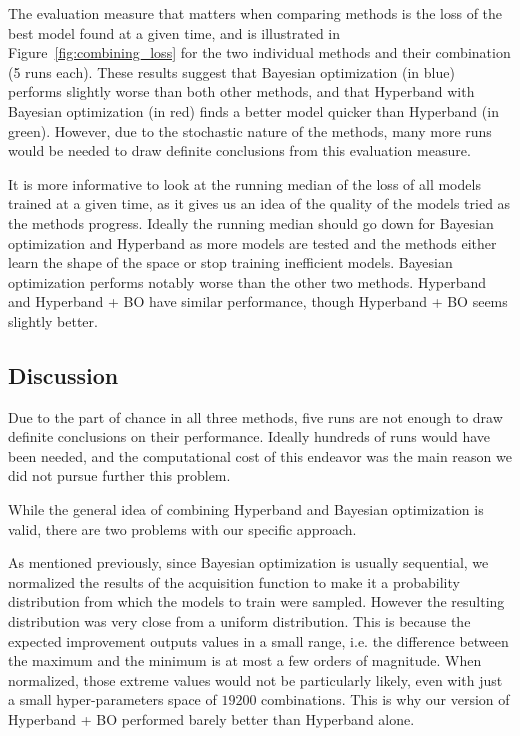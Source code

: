 The evaluation measure that matters when comparing methods is the loss of the best model found at a given time, and is illustrated in Figure~\ref{fig:combining_loss} for the two individual methods and their combination (5 runs each). 
These results suggest that Bayesian optimization (in blue) performs slightly worse than both other methods, and that Hyperband with Bayesian optimization (in red) finds a better model quicker than Hyperband (in green). However, due to the stochastic nature of the methods, many more runs would be needed to draw definite conclusions from this evaluation measure. 

It is more informative to look at the running median of the loss of all models trained at a given time, as it gives us an idea of the quality of the models tried as the methods progress. Ideally the running median should go down for Bayesian optimization and Hyperband as more models are tested and the methods either learn the shape of the space or stop training inefficient models. Bayesian optimization performs notably worse than the other two methods. Hyperband and Hyperband + BO have similar performance, though Hyperband + BO seems slightly better.

\subsection{Discussion}

Due to the part of chance in all three methods, five runs are not enough to draw definite conclusions on their performance. Ideally hundreds of runs would have been needed, and the computational cost of this endeavor was the main reason we did not pursue further this problem.

While the general idea of combining Hyperband and Bayesian optimization is valid, there are two problems with our specific approach. 

As mentioned previously, since Bayesian optimization is usually sequential, we normalized the results of the acquisition function to make it a probability distribution from which the models to train were sampled. However the resulting distribution was very close from a uniform distribution. This is because the expected improvement outputs values in a small range, i.e. the difference between the maximum and the minimum is at most a few orders of magnitude. When normalized, those extreme values would not be particularly likely, even with just a small hyper-parameters space of $19 200$ combinations. This is why our version of Hyperband + BO performed barely better than Hyperband alone. 

